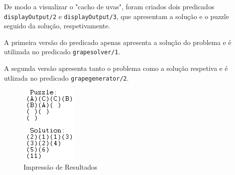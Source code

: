 De modo a visualizar o "cacho de uvas", foram criados dois predicados \verb|displayOutput/2| e \verb|displayOutput/3|, que apresentam a solução e o puzzle seguido da solução, respetivamente.

A primeira versão do predicado apenas apresenta a solução do problema e é utilizada no predicado \verb|grapesolver/1|.

A segunda versão apresenta tanto o problema como a solução respetiva e é utlizada no predicado \verb|grapegenerator/2|.

\begin{figure}
    \centering
    \includegraphics{print.png}
    \caption{Impressão de Resultados}
    \label{fig: results}
\end{figure}